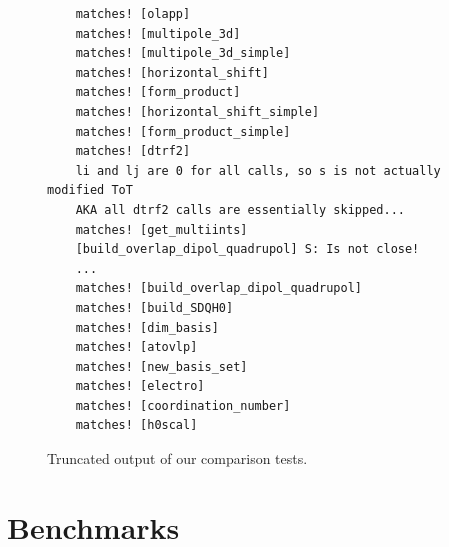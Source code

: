 \begin{figure}[H]
\begin{verbatim}
    matches! [olapp]
    matches! [multipole_3d]
    matches! [multipole_3d_simple]
    matches! [horizontal_shift]
    matches! [form_product]
    matches! [horizontal_shift_simple]
    matches! [form_product_simple]
    matches! [dtrf2]
    li and lj are 0 for all calls, so s is not actually modified ToT
    AKA all dtrf2 calls are essentially skipped...
    matches! [get_multiints]
    [build_overlap_dipol_quadrupol] S: Is not close!
    ...
    matches! [build_overlap_dipol_quadrupol]
    matches! [build_SDQH0]
    matches! [dim_basis]
    matches! [atovlp]
    matches! [new_basis_set]
    matches! [electro]
    matches! [coordination_number]
    matches! [h0scal]
\end{verbatim}
\caption{Truncated output of our comparison tests.}
\label{fig:tests-output}
\end{figure}

\section{Benchmarks}
